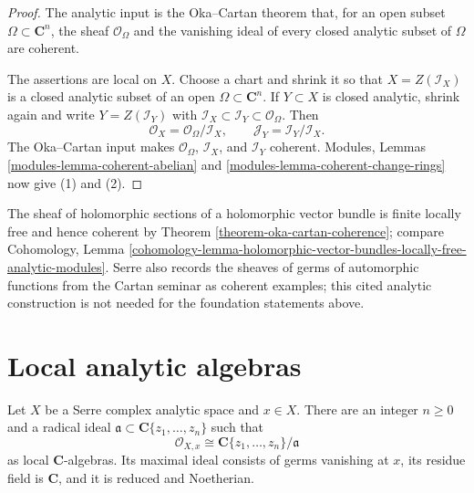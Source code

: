\begin{proof}
The analytic input is the Oka--Cartan theorem that, for an open subset
$\Omega\subset\mathbf C^n$, the sheaf $\mathcal O_\Omega$ and the vanishing
ideal of every closed analytic subset of $\Omega$ are coherent.

The assertions are local on $X$. Choose a chart and shrink it so that
$X=Z(\mathcal I_X)$ is a closed analytic subset of an open
$\Omega\subset\mathbf C^n$. If $Y\subset X$ is closed analytic, shrink again
and write $Y=Z(\mathcal I_Y)$ with
$\mathcal I_X\subset\mathcal I_Y\subset\mathcal O_\Omega$. Then
$$
\mathcal O_X=\mathcal O_\Omega/\mathcal I_X,
\qquad
\mathcal J_Y=\mathcal I_Y/\mathcal I_X.
$$
The Oka--Cartan input makes $\mathcal O_\Omega$, $\mathcal I_X$, and
$\mathcal I_Y$ coherent. Modules, Lemmas
\ref{modules-lemma-coherent-abelian} and
\ref{modules-lemma-coherent-change-rings} now give (1) and (2).
\end{proof}

\begin{remark}[Examples]
\label{remark-examples-coherent-analytic-modules}
The sheaf of holomorphic sections of a holomorphic vector bundle is finite
locally free and hence coherent by Theorem
\ref{theorem-oka-cartan-coherence}; compare Cohomology, Lemma
\ref{cohomology-lemma-holomorphic-vector-bundles-locally-free-analytic-modules}.
Serre also records the sheaves of germs of automorphic functions from the
Cartan seminar as coherent examples; this cited analytic construction is not
needed for the foundation statements above.
\end{remark}


\section{Local analytic algebras}
\label{section-local-analytic-algebras}

\begin{lemma}
\label{lemma-local-analytic-algebra}
\begin{reference}
\cite[\S 1, no. 4, p. 6]{GAGA}
\end{reference}
Let $X$ be a Serre complex analytic space and $x\in X$. There are an
integer $n\geq 0$ and a radical ideal
$\mathfrak a\subset\mathbf C\{z_1,\ldots,z_n\}$ such that
$$
\mathcal O_{X,x}\cong
\mathbf C\{z_1,\ldots,z_n\}/\mathfrak a
$$
as local $\mathbf C$-algebras. Its maximal ideal consists of germs vanishing
at $x$, its residue field is $\mathbf C$, and it is reduced and Noetherian.
\end{lemma}


